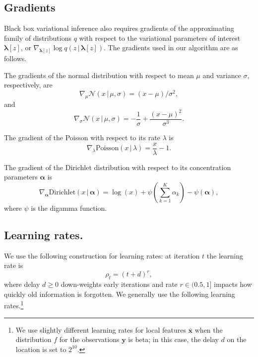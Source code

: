 \documentclass[twoside,11pt]{article}
\newcommand{\g}{\, | \,}
\begin{document}
\subsection{Gradients}
\label{app:gradients}
Black box variational inference also requires gradients of the approximating family of distributions $q$ with respect to the variational parameters of interest $\boldsymbol{\lambda}[z]$, or $\nabla_{\boldsymbol{\lambda}[z]} \log q(z \g \boldsymbol{\lambda}[z])$.  The gradients used in our algorithm are as follows.

The gradients of the normal distribution with respect to mean $\mu$ and variance $\sigma$, respectively, are
\begin{equation}
    \nabla_{\mu} \mathcal{N}(x \g \mu, \sigma) = (x - \mu) / \sigma^2,
\end{equation}
and
\begin{equation}
    \nabla_{\sigma} \mathcal{N}(x \g \mu, \sigma) = -\frac{1}{\sigma} + \frac{(x - \mu)^2}{\sigma^3}.
\end{equation}

The gradient of the Poisson with respect to its rate $\lambda$ is
\begin{equation}
    \nabla_{\lambda} \mbox{Poisson}(x \g \lambda) = \frac{x}{\lambda} - 1.
\end{equation}

The gradient of the Dirichlet distribution with respect to its concentration parameters $\boldsymbol{\alpha}$ is
\begin{equation}
    \nabla_{\boldsymbol{\alpha}} \mbox{Dirichlet}(x \g \boldsymbol{\alpha}) = 
    \log(x) + \psi\left(\sum_{k=1}^K \alpha_k\right) - \psi(\boldsymbol{\alpha}),
\end{equation}
where $\psi$ is the digamma function.

\subsection{Learning rates.}
\label{app:learningrates}
We use the following construction for learning rates: at iteration $t$ the learning rate is
\begin{equation}
    \rho_t = (t + d)^r,
\end{equation}
where delay $d \ge 0$ down-weights early iterations and rate $r \in (0.5,1]$ impacts how quickly old information is forgotten.  We generally use the following learning rates.\footnote{We use slightly different learning rates for local features $\boldsymbol{\bar{x}}$ when the distribution $f$ for the observations $\boldsymbol{y}$ is beta; in this case, the delay $d$ on the location is set to $2^{10}$.}
\end{document}
